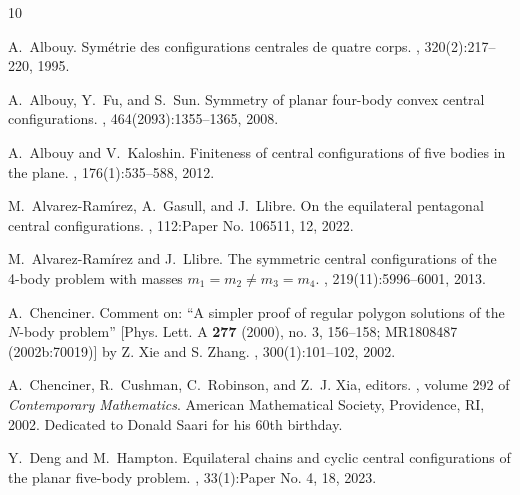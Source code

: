 \documentclass[final,11pt]{article}
\numberwithin{equation}{section}
\theoremstyle{definition}
\begin{document}
\nocite{*}
% 
\def\cprime{$'$} \def\lfhook#1{\setbox0=\hbox{#1}{\ooalign{\hidewidth
  \lower1.5ex\hbox{'}\hidewidth\crcr\unhbox0}}} \def\cprime{$'$}
  \def\cprime{$'$} \def\cprime{$'$} \def\cprime{$'$} \def\cprime{$'$}
  \def\cprime{$'$} \def\cprime{$'$}
\providecommand{\bysame}{\leavevmode\hbox to3em{\hrulefill}\thinspace}
\providecommand{\MR}{\relax\ifhmode\unskip\space\fi MR }
\providecommand{\MRhref}[2]{%
  \href{http://www.ams.org/mathscinet-getitem?mr=#1}{#2}
}
\providecommand{\href}[2]{#2}
\begin{thebibliography}{10}

A.~Albouy.
\newblock Sym\'{e}trie des configurations centrales de quatre corps.
, 320(2):217--220, 1995.

A.~Albouy, Y.~Fu, and S.~Sun.
\newblock Symmetry of planar four-body convex central configurations.
,
  464(2093):1355--1365, 2008.

A.~Albouy and V.~Kaloshin.
\newblock Finiteness of central configurations of five bodies in the plane.
, 176(1):535--588, 2012.

M.~Alvarez-Ram\'{\i}rez, A.~Gasull, and J.~Llibre.
\newblock On the equilateral pentagonal central configurations.
, 112:Paper No. 106511, 12,
  2022.

M.~Alvarez-Ram\'irez and J.~Llibre.
\newblock The symmetric central configurations of the 4-body problem with
  masses {$m_1=m_2\neq m_3=m_4$}.
, 219(11):5996--6001, 2013.

A.~Chenciner.
\newblock Comment on: ``{A} simpler proof of regular polygon solutions of the
  {$N$}-body problem'' [{P}hys. {L}ett. {A} {\bf 277} (2000), no. 3, 156--158;
  {MR}1808487 (2002b:70019)] by {Z}. {X}ie and {S}. {Z}hang.
, 300(1):101--102, 2002.

A.~Chenciner, R.~Cushman, C.~Robinson, and Z.~J. Xia, editors.
, volume 292 of {\em Contemporary
  Mathematics}. American Mathematical Society, Providence, RI, 2002.
\newblock Dedicated to Donald Saari for his 60th birthday.

Y.~Deng and M.~Hampton.
\newblock Equilateral chains and cyclic central configurations of the planar
  five-body problem.
, 33(1):Paper No. 4, 18, 2023.


\end{thebibliography}
\end{document}
